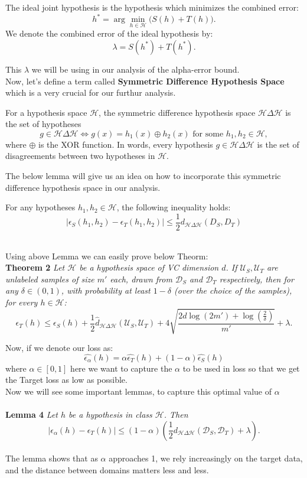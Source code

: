 \documentclass{article}
\begin{document}
\begin{definition}
The ideal joint hypothesis is the hypothesis which minimizes the combined error:
\[
h^* = \arg\min_{h \in \mathcal{H}} \big(S(h) + T(h)\big).
\]
We denote the combined error of the ideal hypothesis by:
\[
\lambda = S(h^*) + T(h^*).
\]
\end{definition}
This $\lambda$ we will be using in our analysis of the alpha-error bound.\\
Now, let's define a term called \textbf{Symmetric Difference Hypothesis Space} which is a very crucial for our furthur analysis.\\
\begin{definition}
For a hypothesis space $\mathcal{H}$, the symmetric difference hypothesis space $\mathcal{H} \Delta \mathcal{H}$ is
the set of hypotheses
\[
g \in \mathcal{H} \Delta \mathcal{H} \iff g(x) = h_1(x) \oplus h_2(x) \text{ for some } h_1, h_2 \in \mathcal{H},
\]
where $\oplus$ is the XOR function. In words, every hypothesis $g \in \mathcal{H} \Delta \mathcal{H}$ is the set of disagreements
between two hypotheses in $\mathcal{H}$.
\end{definition}

The below lemma will give us an idea on how to incorporate this symmetric difference hypothesis space in our analysis.\\
\begin{lemma}
    For any hypotheses $h_1, h_2 \in \mathcal{H}$, the following inequality holds:
    \[
    | \epsilon_S(h_1, h_2) - \epsilon_T(h_1, h_2) | \leq \frac{1}{2} d_{\mathcal{H}\Delta \mathcal{H}}(D_S, D_T)
    \]
\end{lemma}
\\ 
Using above Lemma we can easily prove below Theorm: \\
\textbf{Theorem 2} \textit{Let $\mathcal{H}$ be a hypothesis space of VC dimension $d$. If $\mathcal{U}_S, \mathcal{U}_T$ are unlabeled samples of size $m'$ each, drawn from $\mathcal{D}_S$ and $\mathcal{D}_T$ respectively, then for any $\delta \in (0, 1)$, with probability at least $1 - \delta$ (over the choice of the samples), for every $h \in \mathcal{H}$:}
\[
\epsilon_T(h) \leq \epsilon_S(h) + \frac{1}{2} \hat{d}_{\mathcal{H} \Delta \mathcal{H}}(\mathcal{U}_S, \mathcal{U}_T) + 4 \sqrt{\frac{2d \log(2m') + \log\left(\frac{2}{\delta}\right)}{m'}} + \lambda.
\]

Now, if we denote our loss as:
\[
\hat{\epsilon_\alpha}(h) = \alpha \hat{\epsilon_T}(h) + (1-\alpha) \hat{\epsilon_S}(h)
\]
where $\alpha \in [0,1]$
 here we want to capture the $\alpha$ to be used in loss so that we get the Target loss as low as possible.
 \\
 Now we will see some important lemmas, to capture this optimal value of $\alpha$
 \\ \\
 \textbf{Lemma 4} \textit{Let $h$ be a hypothesis in class $\mathcal{H}$. Then}
\[
|\epsilon_\alpha(h) - \epsilon_T(h)| \leq (1 - \alpha) \left( \frac{1}{2} d_{\mathcal{H} \Delta \mathcal{H}}(\mathcal{D}_S, \mathcal{D}_T) + \lambda \right).
\]
\\
The lemma shows that as $\alpha$ approaches 1, we rely increasingly on the target data, and the distance between domains matters less and less.
\end{document}
